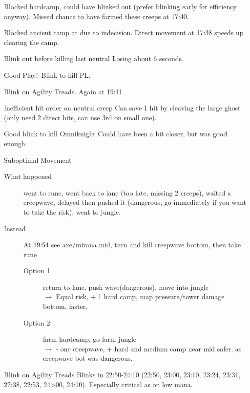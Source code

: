 \documentclass{article}
\newenvironment{eventlog}
    {
        \begin{description}
    }
    {
        \end{description}
    }
\newcommand{\logentry}[3]{\hypertarget{log:#1}{\item[\textcolor{highlight}{#1}] #2 \;#3}}
\newcommand{\goodplay}{\colorbox{goodplaycolor}{Good Play!}\ }
\begin{document}
\begin{eventlog}
    \logentry{17:00}{Blocked hardcamp, could have blinked out (prefer blinking early for efficiency anyway). }{Missed chance to have farmed these creeps at 17:40.}


    \logentry{18:00}{Blocked ancient camp at due to indecision.}{Direct movement at 17:38 speeds up clearing the camp.}
  
    \logentry{18:30}{Blink out before killing last neutral}{Losing  about 6 seconds.}
  
    \logentry{19:00}{\goodplay Blink to kill PL.}{}

    \logentry{19:03}{Blink on Agility Treads. }{Again at 19:11}

    \logentry{19:20}{Inefficient hit order on neutral creep}{Can save 1 hit by cleaving the large ghost (only need 2 direct hits, can use 3rd on small one).}

    \logentry{19:42}{Good blink to kill Omniknight }{Could have been a bit closer, but was good enough.}

    \logentry{19:50}{Suboptimal Movement}{
    \begin{description}
       \item [What happened] went to rune, went back to lane (too late, missing 2 creeps), waited a creepwave, delayed then pushed it (dangerous, go immediately if you want to take the risk), went to jungle.
       \item [Instead]
            At 19:54 see axe/mirana mid, turn and kill creepwave bottom, then take rune
            \begin{description}
                \item [Option 1] return to lane, push wave(dangerous), move into jungle\\ 
             $\rightarrow$  Equal risk, + 1 hard camp, map pressure/tower damage bottom, faster.
                \item [Option 2] farm hardcamp, go farm jungle\\ 
             $\rightarrow$ - one creepwave, + hard and medium camp near mid
    safer, as creepwave bot was dangerous.
            \end{description}
        \end{description}
            }



    \logentry{22:50}{Blink on Agility Treads}{ 9 Blinks in 22:50-24:10 (22:50, 23:00, 23:10, 23:24, 23:31, 22:38, 22:53, 24>00, 24:10). Especially critical as on low mana. }
   

\end{eventlog}
\end{document}
